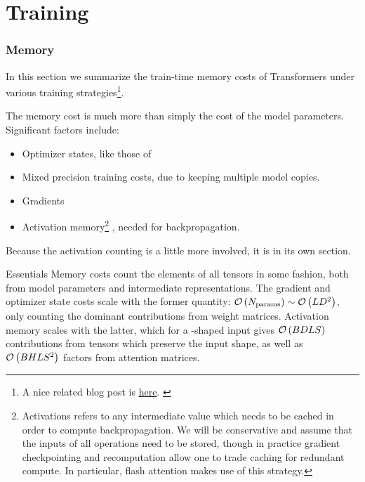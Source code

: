 \documentclass[11pt]{article}
\begin{document}
\part{Training}

\section{Memory \label{sec_memory_training}}

In this section we summarize the train-time memory costs of Transformers under various training
strategies\footnote{A nice related blog post is \href{https://blog.eleuther.ai/transformer-math/}{here}. \label{foot_eleuther_math_101} }.

The memory cost is much more than simply the cost of the model
parameters. Significant factors include:
\begin{itemize}
\item Optimizer states, like those of 
\item Mixed precision training costs, due to keeping multiple model copies.
\item Gradients
\item Activation memory\footnote{Activations refers to any intermediate value which needs to be
    cached in order to compute backpropagation. We will be conservative and assume that the inputs
of all operations need to be stored, though in practice gradient checkpointing and recomputation
allow one to trade caching for redundant compute. In particular, flash attention
\cite{dao2022flashattention} makes use of this strategy.} , needed for backpropagation.
\end{itemize}
Because the activation counting is a little more involved, it is in its own section.


\begin{nicebox}{Essentials}
Memory costs count the elements of all tensors in some fashion, both from model parameters and
intermediate representations. The gradient and optimizer state costs scale with the former quantity:
$ \mathcal{O} \left ( N _{ {\rm params}  } \right ) \sim \mathcal{O} \left ( L D ^{ 2 } \right )$, only counting
the dominant contributions from weight matrices. Activation memory scales with the latter,
which for a -shaped input gives $ \mathcal{O} \left ( BDLS  \right ) $ contributions
from tensors which preserve the input shape, as well as $ \mathcal{O} \left( BHLS ^{ 2 } \right)  $
factors from attention matrices.
\end{nicebox}
\end{document}
